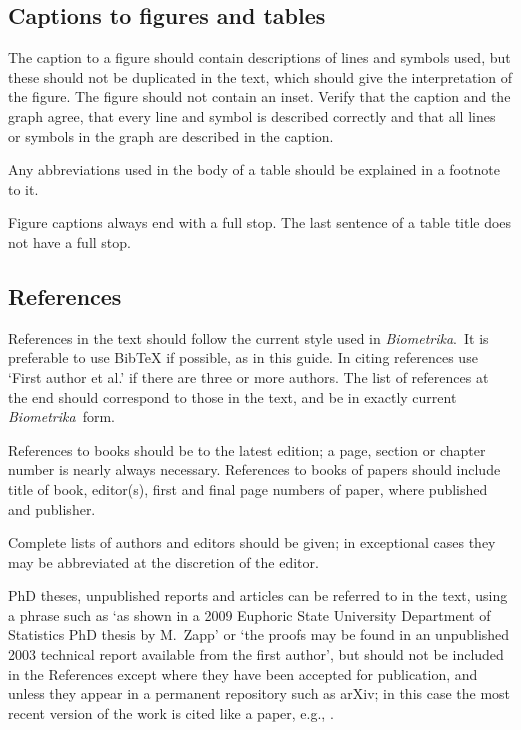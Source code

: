 \documentclass[lineno]{biometrika}
\def\Bka{{\it Biometrika}}
\begin{document}
\subsection{Captions to figures and tables}

The caption to a figure should contain descriptions of lines and symbols used, but these should not be duplicated in the text, which should give the interpretation of the figure.  The figure should not contain an inset.  Verify that the caption and the graph agree, that every line and symbol is described correctly and that all lines or symbols in the graph are described in the caption.

Any abbreviations used in the body of a table should be explained in a footnote to it.

Figure captions always end with a full stop. The last sentence of a table title does not have a full stop.

\subsection{References}

References in the text should follow the current style used in \Bka.\ It is preferable to use BibTeX
if possible, as in this guide.  In citing
references use `First author et al.' if there are three or more authors. The list of references at
the end should correspond to those in the text, and be in exactly current \Bka\
form.

References to books should be to the latest edition; a page, section or chapter number
is nearly always necessary. References to books of papers should include title of book,
editor(s), first and final page numbers of paper, where published and publisher.

Complete lists of authors and editors should be given; in exceptional cases they may be abbreviated at the discretion of the editor.

PhD theses, unpublished reports and articles can be referred to in the text, using a phrase such as `as shown in a 2009 Euphoric State University Department of Statistics PhD thesis by M.~Zapp' or `the proofs may be found in an unpublished 2003 technical report available from the first author', but should not be included in the References except where they have been accepted for publication, and unless they appear in a permanent repository such as arXiv; in this case the most recent version of the work is cited like a paper, e.g., \citet{Berrendero.etal:2015}.
\end{document}
